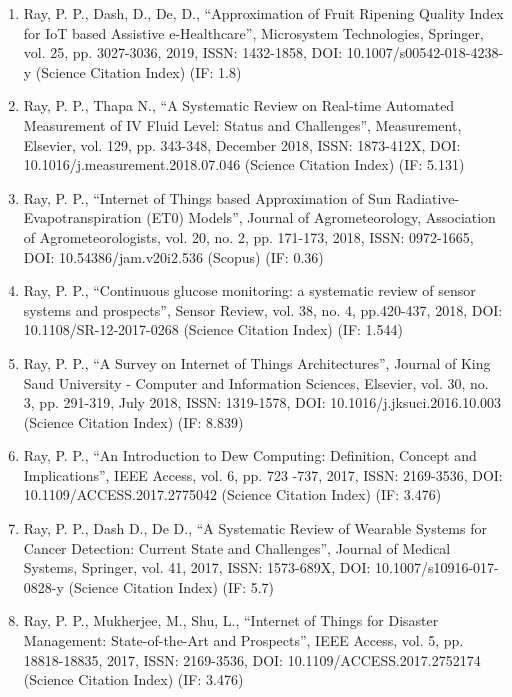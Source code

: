 \documentclass[11pt,a4paper]{moderncv}
\begin{document}
\begin{adjustwidth}{6em}{0pt}
\begin{enumerate}
		\item Ray, P. P., Dash, D., De, D., “Approximation of Fruit Ripening Quality Index for IoT based Assistive e-Healthcare”, Microsystem Technologies, Springer, vol. 25, pp. 3027-3036, 2019, ISSN: 1432-1858, DOI: 10.1007/s00542-018-4238-y (Science Citation Index) (IF: 1.8)
		
		\item Ray, P. P., Thapa N., “A Systematic Review on Real-time Automated Measurement of IV Fluid Level: Status and Challenges”, Measurement, Elsevier, vol. 129, pp. 343-348, December 2018, ISSN: 1873-412X, DOI: 10.1016/j.measurement.2018.07.046 (Science Citation Index) (IF: 5.131)
		
		\item Ray, P. P., “Internet of Things based Approximation of Sun Radiative-Evapotranspiration (ET0) Models”, Journal of Agrometeorology, Association of Agrometeorologists, vol. 20, no. 2, pp. 171-173, 2018, ISSN: 0972-1665, DOI: 10.54386/jam.v20i2.536 (Scopus) (IF: 0.36)
		
		\item Ray, P. P., “Continuous glucose monitoring: a systematic review of sensor systems and prospects”, Sensor Review, vol. 38, no. 4, pp.420-437, 2018, DOI: 10.1108/SR-12-2017-0268 (Science Citation Index) (IF: 1.544)
		
		\item Ray, P. P., “A Survey on Internet of Things Architectures”, Journal of King Saud University - Computer and Information Sciences, Elsevier, vol. 30, no. 3, pp. 291-319, July 2018, ISSN: 1319-1578, DOI: 10.1016/j.jksuci.2016.10.003 (Science Citation Index) (IF: 8.839)
		
		\item Ray, P. P., “An Introduction to Dew Computing: Definition, Concept and Implications”, IEEE Access, vol. 6, pp. 723 -737, 2017, ISSN: 2169-3536, DOI: 10.1109/ACCESS.2017.2775042 (Science Citation Index) (IF: 3.476)
		
		\item Ray, P. P., Dash D., De D., “A Systematic Review of Wearable Systems for Cancer Detection: Current State and Challenges”, Journal of Medical Systems, Springer, vol. 41, 2017, ISSN: 1573-689X, DOI: 10.1007/s10916-017-0828-y (Science Citation Index) (IF: 5.7)
		
		\item Ray, P. P., Mukherjee, M., Shu, L., “Internet of Things for Disaster Management: State-of-the-Art and Prospects”, IEEE Access, vol. 5, pp. 18818-18835, 2017, ISSN: 2169-3536, DOI: 10.1109/ACCESS.2017.2752174 (Science Citation Index) (IF: 3.476)
		

\end{enumerate}
\end{adjustwidth}
\end{document}
